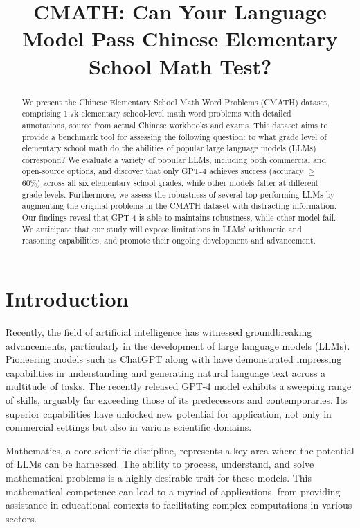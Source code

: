 \title{CMATH: Can Your Language Model Pass Chinese Elementary School Math Test?}

\begin{abstract}
We present the Chinese Elementary School Math Word Problems (CMATH) dataset, comprising 1.7k elementary school-level math word problems with detailed annotations, source from actual Chinese workbooks and exams. This dataset aims to provide a benchmark tool for assessing the following question: to what grade level of elementary school math do the abilities of popular large language models (LLMs) correspond? We evaluate a variety of popular LLMs, including both commercial and open-source options, and discover that only GPT-4 achieves success (accuracy $\geq$ 60\%) across all six elementary school grades, while other models falter at different grade levels. Furthermore, we assess the robustness of several top-performing LLMs by augmenting the original problems in the CMATH dataset with distracting information. Our findings reveal that GPT-4 is able to maintains robustness, while other model fail. We anticipate that our study will expose limitations in LLMs' arithmetic and reasoning capabilities, and promote their ongoing development and advancement.
\end{abstract}

\section{Introduction}
Recently, the field of artificial intelligence has witnessed groundbreaking advancements, particularly in the development of large language models (LLMs). Pioneering models such as ChatGPT \citep{instruct_gpt} along with \citep{galactica} have demonstrated impressing capabilities in understanding and generating natural language text across a multitude of tasks. The recently released GPT-4 \citep{gpt4_report, gpt4_sparks} model exhibits a sweeping range of skills, arguably far exceeding those of its predecessors and contemporaries. Its superior capabilities have unlocked new potential for application, not only in commercial settings but also in various scientific domains.

Mathematics, a core scientific discipline, represents a key area where the potential of LLMs can be harnessed. The ability to process, understand, and solve mathematical problems is a highly desirable trait for these models. This mathematical competence can lead to a myriad of applications, from providing assistance in educational contexts to facilitating complex computations in various sectors.

